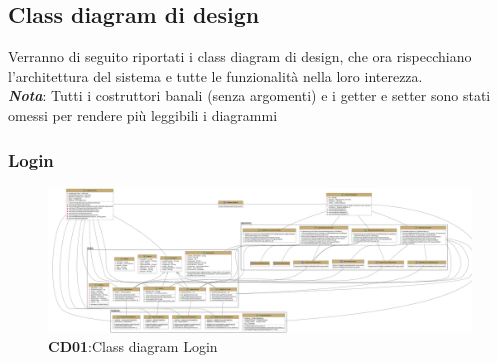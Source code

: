 \subsection{Class diagram di design}
    \begin{flushleft}
        Verranno di seguito riportati i class diagram di design, che ora rispecchiano l'architettura del sistema e tutte le funzionalità nella loro
        interezza. \\
        \emph{\textbf{Nota}}: Tutti i costruttori banali (senza argomenti) e i getter e setter sono stati omessi per rendere più leggibili 
        i diagrammi
    \end{flushleft}

    \subsubsection{Login}
        \begin{figure}[H]
            \centering
            \includegraphics[scale=0.12]{assets/diagrammi/Class diagram di design/ClassDiagram_Login.png}
            \caption*{\textbf{CD01}:Class diagram Login}\label{fig:ClassDiagram_Login}
        \end{figure}


